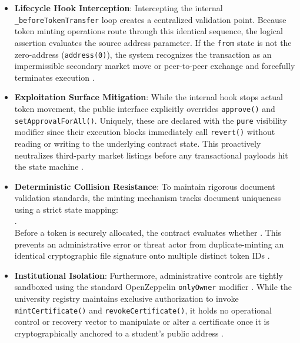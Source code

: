 \begin{itemize}
    \item \textbf{Lifecycle Hook Interception}: Intercepting the internal \texttt{\_beforeTokenTransfer} loop creates a centralized validation point. Because token minting operations route through this identical sequence, the logical assertion evaluates the source address parameter. If the \texttt{from} state is not the zero-address (\texttt{address(0)}), the system recognizes the transaction as an impermissible secondary market move or peer-to-peer exchange and forcefully terminates execution \cite{nfterc721web}.

    \item \textbf{Exploitation Surface Mitigation}: While the internal hook stops actual token movement, the public interface explicitly overrides \texttt{approve()} and \texttt{setApprovalForAll()}. Uniquely, these are declared with the \texttt{pure} visibility modifier since their execution blocks immediately call \texttt{revert()} without reading or writing to the underlying contract state. This proactively neutralizes third-party market listings before any transactional payloads hit the state machine \cite{nfterc721web}.

    \item \textbf{Deterministic Collision Resistance}: To maintain rigorous document validation standards, the minting mechanism tracks document uniqueness using a strict state mapping: \\
          . \\
          Before a token is securely allocated, the contract evaluates whether . This prevents an administrative error or threat actor from duplicate-minting an identical cryptographic file signature onto multiple distinct token IDs \cite{nfterc721web}.

    \item \textbf{Institutional Isolation}: Furthermore, administrative controls are tightly sandboxed using the standard OpenZeppelin \texttt{onlyOwner} modifier \cite{perez2020smartcontracts}. While the university registry maintains exclusive authorization to invoke \texttt{mintCertificate()} and \texttt{revokeCertificate()}, it holds no operational control or recovery vector to manipulate or alter a certificate once it is cryptographically anchored to a student's public address \cite{onlinev0835web}.
\end{itemize}

